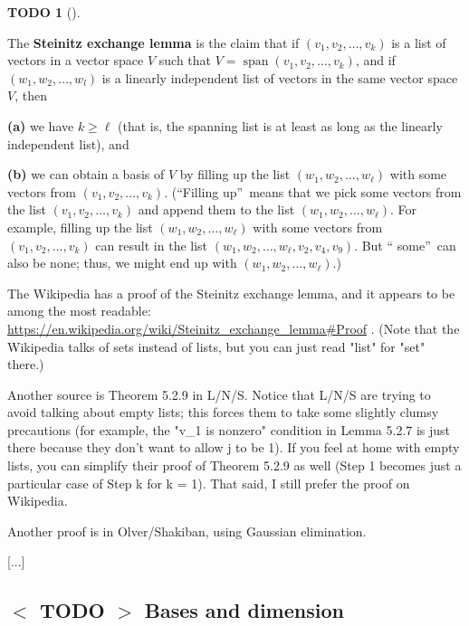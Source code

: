 \documentclass[numbers=enddot,12pt,final,onecolumn,notitlepage]{scrartcl}%
\theoremstyle{definition}
\newtheorem{quest}[theo]{TODO}
\newenvironment{todo}[1][]
{\begin{quest}[#1]\begin{leftbar}}
{\end{leftbar}\end{quest}}
\begin{document}
\begin{todo}
The \textbf{Steinitz exchange lemma} is the claim that if $\left(  v_{1}%
,v_{2},\ldots,v_{k}\right)  $ is a list of vectors in a vector space $V$ such
that $V=\operatorname*{span}\left(  v_{1},v_{2},\ldots,v_{k}\right)  $, and if
$\left(  w_{1},w_{2},\ldots,w_{l}\right)  $ is a linearly independent list of
vectors in the same vector space $V$, then

\textbf{(a)} we have $k\geq\ell$ (that is, the spanning list is at least as
long as the linearly independent list), and

\textbf{(b)} we can obtain a basis of $V$ by filling up the list $\left(
w_{1},w_{2},\ldots,w_{\ell}\right)  $ with some vectors from $\left(
v_{1},v_{2},\ldots,v_{k}\right)  $. (\textquotedblleft Filling
up\textquotedblright\ means that we pick some vectors from the list $\left(
v_{1},v_{2},\ldots,v_{k}\right)  $ and append them to the list $\left(
w_{1},w_{2},\ldots,w_{\ell}\right)  $. For example, filling up the list
$\left(  w_{1},w_{2},\ldots,w_{\ell}\right)  $ with some vectors from $\left(
v_{1},v_{2},\ldots,v_{k}\right)  $ can result in the list $\left(  w_{1}%
,w_{2},\ldots,w_{\ell},v_{2},v_{4},v_{9}\right)  $. But \textquotedblleft
some\textquotedblright\ can also be none; thus, we might end up with $\left(
w_{1},w_{2},\ldots,w_{\ell}\right)  $.)

The Wikipedia has a proof of the Steinitz exchange lemma, and it appears to be
among the most readable:
\url{https://en.wikipedia.org/wiki/Steinitz_exchange_lemma#Proof} . (Note that
the Wikipedia talks of sets instead of lists, but you can just read "list" for
"set" there.)

Another source is Theorem 5.2.9 in L/N/S. Notice that L/N/S are trying to
avoid talking about empty lists; this forces them to take some slightly clumsy
precautions (for example, the "v\_1 is nonzero" condition in Lemma 5.2.7 is
just there because they don't want to allow j to be 1). If you feel at home
with empty lists, you can simplify their proof of Theorem 5.2.9 as well (Step
1 becomes just a particular case of Step k for k = 1). That said, I still
prefer the proof on Wikipedia.

Another proof is in Olver/Shakiban, using Gaussian elimination.
\end{todo}

[...]

\subsection{%
$<$%
TODO%
$>$
Bases and dimension}
\end{document}
